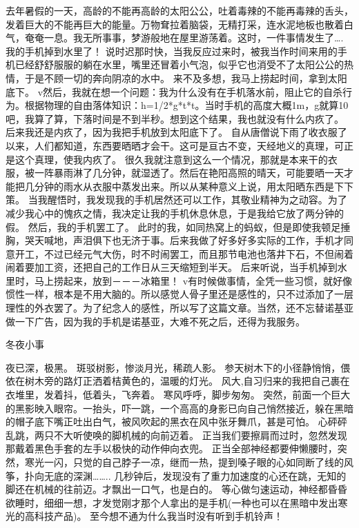   去年暑假的一天，高龄的不能再高龄的太阳公公，吐着毒辣的不能再毒辣的舌头，发着巨大的不能再巨大的能量。万物耷拉着脑袋，无精打采，连水泥地板也散着白气，奄奄一息。我无所事事，梦游般地在屋里游荡着。这时，一件事情发生了….
  我的手机掉到水里了！
  说时迟那时快，当我反应过来时，被我当作时间来用的手机已经舒舒服服的躺在水里，嘴里还冒着小气泡，似乎它也消受不了太阳公公的热情，于是不顾一切的奔向阴凉的水中。
  来不及多想，我马上捞起时间，拿到太阳底下。
 v然后，我就在想一个问题：我为什么没有在手机落水前，阻止它的自杀行为。根据物理的自由落体知识：h=1/2*g*t*t。当时手机的高度大概1m，g就算10吧，我算了算，下落时间是不到半秒。想到这个结果，我也就没有什么内疚了。
  后来我还是内疚了，因为我把手机放到太阳底下了。
  自从唐僧说下雨了收衣服了以来，人们都知道，东西要晒晒才会干。这可是亘古不变，天经地义的真理，可正是这个真理，使我内疚了。
  很久我就注意到这么一个情况，那就是本来干的衣服，被一阵暴雨淋了几分钟，就湿透了。然后在艳阳高照的晴天，可能要晒一天才能把几分钟的雨水从衣服中蒸发出来。所以从某种意义上说，用太阳晒东西是下下策。
  当我醒悟时，我发现我的手机居然还可以工作，其敬业精神为之动容。为了减少我心中的愧疚之情，我决定让我的手机休息休息，于是我给它放了两分钟的假。
  然后，我的手机罢工了。
  此时的我，如同热窝上的蚂蚁，但是即使我顿足捶胸，哭天喊地，声泪俱下也无济于事。后来我做了好多好多实际的工作，手机才同意开工，不过已经元气大伤，时不时闹罢工，而且那节电池也落井下石，不但闹着闹着要加工资，还把自己的工作日从三天缩短到半天。
  后来听说，当手机掉到水里时，马上捞起来，放到－－－冰箱里！
 v有时候做事情，全凭一些习惯，就好像惯性一样，根本是不用大脑的。所以感觉人骨子里还是感性的，只不过添加了一层理性的外衣罢了。为了纪念人的感性，所以写了这篇文章。当然，还不忘替诺基亚做一下广告，因为我的手机是诺基亚，大难不死之后，还得为我服务。


冬夜小事

  夜已深，极黑。
  斑驳树影，惨淡月光，稀疏人影。
  参天树木下的小径静悄悄，偎依在树木旁的路灯正洒着桔黄色的，温暖的灯光。
  风大,自习归来的我把自己裹在衣堆里，发着抖，低着头，飞奔着。
  寒风呼呼，脚步匆匆。
  突然，前面一个巨大的黑影映入眼帘。一抬头，吓一跳，一个高高的身影已向自己悄然接近，躲在黑暗的帽子底下嘴正吐出白气，被风吹起的黑衣在风中张牙舞爪，甚是可怕。
  心砰砰乱跳，两只不大听使唤的脚机械的向前迈着。
  正当我们要擦肩而过时，忽然发现那戴着黑色手套的左手以极快的动作伸向衣兜。
  正当全部神经都要伸懒腰时，突然，寒光一闪，只觉的自己脖子一凉，继而一热，提到嗓子眼的心如同断了线的风筝，扑向无底的深渊……..
  几秒钟后，发现没有了重力加速度的心还在跳，无知的脚还在机械的往前迈。才飘出一口气，也是白的。
  等心做匀速运动，神经都昏昏欲睡时，细细一想，才发觉刚才那个人拿出的是手机(一种也可以在黑暗中发出寒光的高科技产品)。
  至今想不通为什么我当时没有听到手机铃声！



